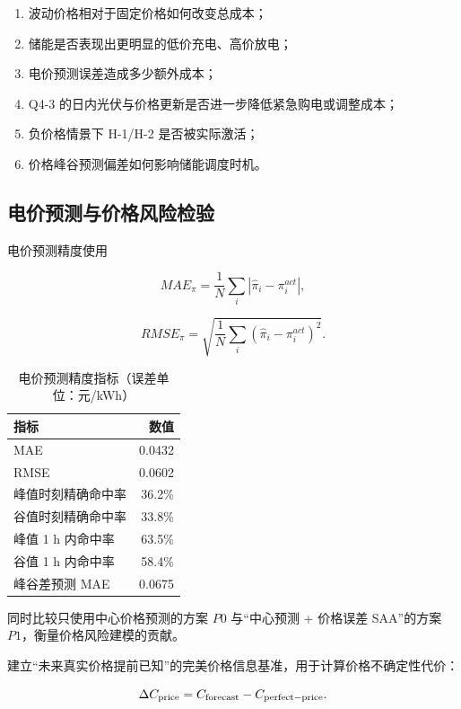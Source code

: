 \begin{enumerate}
\item 波动价格相对于固定价格如何改变总成本；
\item 储能是否表现出更明显的低价充电、高价放电；
\item 电价预测误差造成多少额外成本；
\item Q4-3 的日内光伏与价格更新是否进一步降低紧急购电或调整成本；
\item 负价格情景下 H-1/H-2 是否被实际激活；
\item 价格峰谷预测偏差如何影响储能调度时机。
\end{enumerate}

\subsection{电价预测与价格风险检验}

电价预测精度使用

\[
MAE_\pi
=
\frac1N
\sum_i
|\hat\pi_i-\pi_i^{act}|,
\]

\begin{equation}
RMSE_\pi
=
\sqrt{
\frac1N
\sum_i
(\hat\pi_i-\pi_i^{act})^2
}.
\end{equation}

\begin{table}[H]
\centering
{}
\begin{tabular}{lr}
\toprule
指标 & 数值 \\
\midrule
MAE & 0.0432 \\
RMSE & 0.0602 \\
峰值时刻精确命中率 & 36.2\% \\
谷值时刻精确命中率 & 33.8\% \\
峰值 1 h 内命中率 & 63.5\% \\
谷值 1 h 内命中率 & 58.4\% \\
峰谷差预测 MAE & 0.0675 \\
\bottomrule
\end{tabular}
\caption{电价预测精度指标（误差单位：元/kWh）}
\label{tab:12}
\end{table}

同时比较只使用中心价格预测的方案 \(P0\) 与“中心预测 + 价格误差 SAA”的方案 \(P1\)，衡量价格风险建模的贡献。

建立“未来真实价格提前已知”的完美价格信息基准，用于计算价格不确定性代价：

\begin{equation}
\Delta C_{\rm price}
=
C_{\rm forecast}
-
C_{\rm perfect-price}.
\end{equation}

